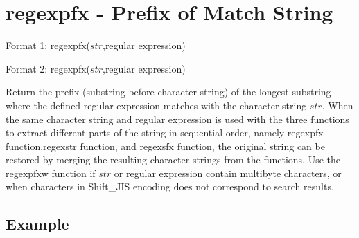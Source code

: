 
%

\section{regexpfx - Prefix of Match String\label{sect:regexpfx}}

Format 1: regexpfx($str$,regular expression)

Format 2: regexpfx($str$,regular expression)

Return the prefix (substring before character string) of the longest substring where the defined regular expression matches with the character string $str$. When the same character string and regular expression is used with the three functions to extract different parts of the string in sequential order, namely regexpfx function,regexstr function, and regexsfx function, the original string can be restored by merging the resulting character strings from the functions.  Use the regexpfxw function if $str$ or regular expression contain multibyte characters, or when characters in Shift\_JIS encoding does not correspond to search results. 

\subsection*{Example}


%

